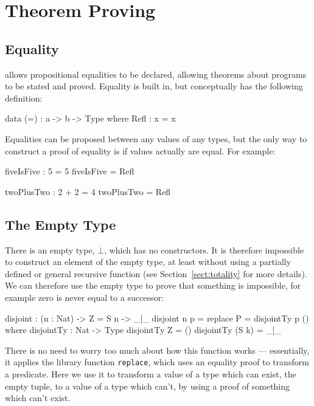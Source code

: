 \section{Theorem Proving}

\subsection{Equality}

\Idris{} allows propositional equalities to be declared, allowing theorems about
programs to be stated and proved.
Equality is built in, but conceptually has the following definition:

\begin{code}
data (=) : a -> b -> Type where
   Refl : x = x
\end{code}

\noindent
Equalities can be proposed between any values of any types, but the only way to construct a proof of equality is if values actually are equal.
For example:

\begin{code}
fiveIsFive : 5 = 5
fiveIsFive = Refl

twoPlusTwo : 2 + 2 = 4
twoPlusTwo = Refl
\end{code}

\subsection{The Empty Type}

\label{sect:empty}

There is an empty type, $\bot$, which has no constructors.
It is therefore impossible to construct an element of the empty type, at least without using a partially defined or general recursive function (see Section~\ref{sect:totality} for more details).
We can therefore use the empty type to prove that something is impossible, for example zero is never equal to a successor:

\begin{code}
disjoint : (n : Nat) -> Z = S n -> _|_
disjoint n p = replace {P = disjointTy} p ()
  where
    disjointTy : Nat -> Type
    disjointTy Z = ()
    disjointTy (S k) = _|_
\end{code}

\noindent
There is no need to worry too much about how this function works --- essentially, it applies the library function \texttt{replace}, which uses an equality proof to  transform a predicate.
Here we use it to transform a value of a type which can exist, the empty tuple, to a value of a type which can't, by using a proof of something which can't exist.

